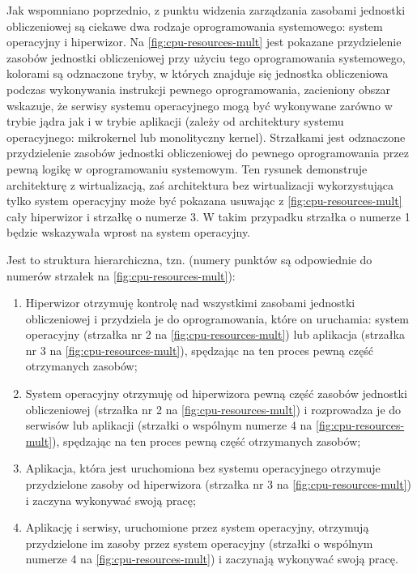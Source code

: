 \documentclass[../../main]{subfiles}
\begin{document}
Jak wspomniano poprzednio, z punktu widzenia zarządzania zasobami jednostki obliczeniowej są ciekawe dwa rodzaje oprogramowania systemowego: system operacyjny i hiperwizor. Na \cref{fig:cpu-resources-mult} jest pokazane przydzielenie zasobów jednostki obliczeniowej przy użyciu tego oprogramowania systemowego, kolorami są odznaczone tryby, w których znajduje się jednostka obliczeniowa podczas wykonywania instrukcji pewnego oprogramowania, zacieniony obszar wskazuje, że serwisy systemu operacyjnego mogą być wykonywane zarówno w trybie jądra jak i w trybie aplikacji (zależy od architektury systemu operacyjnego: mikrokernel lub monolityczny kernel). Strzałkami jest odznaczone przydzielenie zasobów jednostki obliczeniowej do pewnego oprogramowania przez pewną logikę w oprogramowaniu systemowym. Ten rysunek demonstruje architekturę z wirtualizacją, zaś architektura bez wirtualizacji wykorzystująca tylko system operacyjny może być pokazana usuwając z \cref{fig:cpu-resources-mult} cały hiperwizor i strzałkę o numerze 3. W takim przypadku strzałka o numerze 1 będzie wskazywała wprost na system operacyjny.

Jest to struktura hierarchiczna, tzn. (numery punktów są odpowiednie do numerów strzałek na \cref{fig:cpu-resources-mult}):

\begin{enumerate}
    \item Hiperwizor otrzymuję kontrolę nad wszystkimi zasobami jednostki obliczeniowej i przydziela je do oprogramowania, które on uruchamia: system operacyjny (strzałka nr 2 na \cref{fig:cpu-resources-mult}) lub aplikacja (strzałka nr 3 na \cref{fig:cpu-resources-mult}), spędzając na ten proces pewną część otrzymanych zasobów;
    \item System operacyjny otrzymuję od hiperwizora pewną część zasobów jednostki obliczeniowej (strzałka nr 2 na \cref{fig:cpu-resources-mult}) i rozprowadza je do serwisów lub aplikacji (strzałki o wspólnym numerze 4 na \cref{fig:cpu-resources-mult}), spędzając na ten proces pewną część otrzymanych zasobów;
    \item Aplikacja, która jest uruchomiona bez systemu operacyjnego otrzymuje przydzielone zasoby od hiperwizora (strzałka nr 3 na \cref{fig:cpu-resources-mult}) i zaczyna wykonywać swoją pracę;
    \item Aplikację i serwisy, uruchomione przez system operacyjny, otrzymują przydzielone im zasoby przez system operacyjny (strzałki o wspólnym numerze 4 na \cref{fig:cpu-resources-mult}) i zaczynają wykonywać swoją pracę.
\end{enumerate}
\end{document}
